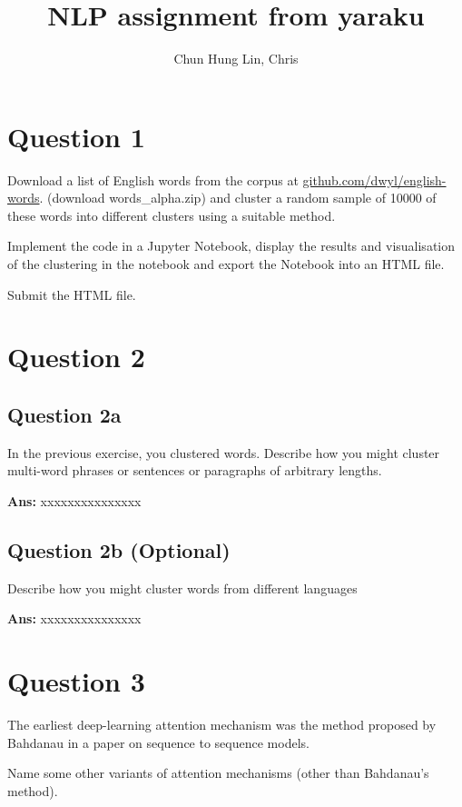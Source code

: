 \documentclass{kthreport}
\title{NLP assignment from yaraku}
\author{Chun Hung Lin, Chris}
\begin{document}
\maketitle


\section{Question 1}

Download a list of English words from the corpus at \hspace{0.1em}
\href{https://github.com/dwyl/english-words}{github.com/dwyl/english-words}.
(download words\_alpha.zip) and cluster a random sample of 10000 of
these words into different clusters using a suitable method.

Implement the code in a Jupyter Notebook, display the results and visualisation
of the clustering in the notebook and export the Notebook into an HTML file.

Submit the HTML file.

\section{Question 2}
\subsection{Question 2a}
In the previous exercise, you clustered words.
Describe how you might cluster multi-word phrases or sentences or paragraphs of
arbitrary lengths.

\textbf{Ans:}
xxxxxxxxxxxxxxx

\subsection{Question 2b (Optional)}
Describe how you might cluster words from different languages

\textbf{Ans:}
xxxxxxxxxxxxxxx
\section{Question 3}
The earliest deep-learning attention mechanism was the method proposed by Bahdanau
in a paper on sequence to sequence models.

Name some other variants of attention mechanisms (other than Bahdanau's method).
\end{document}
